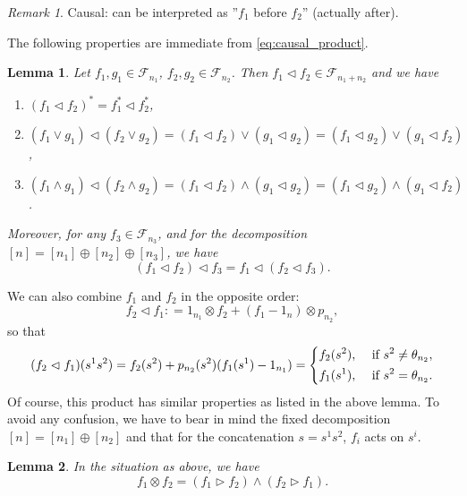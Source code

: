 \documentclass[12pt]{article}
\newtheorem{lemma}{Lemma}
\theoremstyle{definition}
\theoremstyle{remark}
\newtheorem{remark}{Remark}
\def\Fe{\mathcal F}
\def\vtl{\vartriangleleft}
\def\vtr{\vartriangleright}
\begin{document}
\begin{remark} Causal: can be interpreted as ''$f_1$ before $f_2$'' (actually after).


\end{remark}

The following properties are immediate from \eqref{eq:causal_product}. 

\begin{lemma}\label{lemma:causal_product}
Let $f_1,g_1\in \Fe_{n_1}$, $f_2,g_2\in \Fe_{n_2}$. Then $f_1\vartriangleleft f_2\in \Fe_{n_1+n_2}$ and we
have 
\begin{enumerate}
\item[(i)] $(f_1\vtl f_2)^*=f_1^*\vtl f_2^*$,
\item[(ii)]$(f_1\vee g_1)\vtl (f_2\vee g_2)=(f_1\vtl f_2)\vee ( g_1\vtl g_2)=(f_1\vtl
g_2)\vee (g_1\vtl f_2)$,
\item[(iii)] $(f_1\wedge g_1)\vtl (f_2\wedge g_2)=(f_1\vtl f_2)\wedge ( g_1\vtl g_2)=(f_1\vtl
g_2)\wedge (g_1\vtl f_2)$.
\end{enumerate}
Moreover, for any $f_3\in \Fe_{n_3}$, and for the decomposition $[n]=[n_1]\oplus
[n_2]\oplus [n_3]$, we have 
\[
(f_1\vtl f_2)\vtl f_3=f_1\vtl (f_2\vtl f_3).
\]
\end{lemma}



We can also combine $f_1$ and $f_2$ in the opposite order:
\[
f_2\vtl f_1: =1_{n_1}\otimes f_2+(f_1-1_n)\otimes p_{n_2},
\]
so that
\begin{equation}\label{eq:causal_product_op}
(f_2\vtl f_1)(s^1s^2)=f_2(s^2)+p_{n_2}(s^2)(f_1(s^1)-1_{n_1})=\begin{dcases} f_2(s^2), & \text{ if }
s^2\ne \theta_{n_2},\\
   f_1(s^1), & \text{ if } s^2=\theta_{n_2}.
   \end{dcases}
\end{equation}
Of course, this product has similar properties as listed in the above lemma.
To avoid any confusion, we have to bear in mind the fixed decomposition $[n]=[n_1]\oplus
[n_2]$ and that for the concatenation $s=s^1s^2$, $f_i$ acts on $s^i$. 

\begin{lemma}\label{lemma:causal_tensor} In the situation as above, we have
\[
f_1\otimes f_2 = (f_1\vtr f_2)\wedge (f_2\vtr f_1).
\]

\end{lemma}
\end{document}
